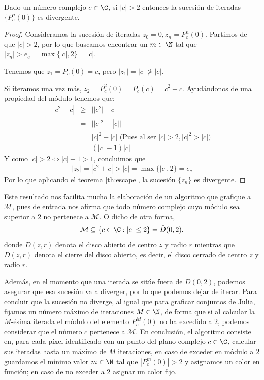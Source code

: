 \begin{proposicion}
  \label{prop:mandelbrot-escape}
  Dado un número complejo $c\in\C$, si $|c|>2$ entonces la sucesión de iteradas $\{P_c^n(0)\}$ es divergente.
\end{proposicion}
\begin{proof}
  Consideramos la sucesión de iteradas $z_0 = 0, z_n=P_c^n(0)$. Partimos de que $|c|>2$, por lo que buscamos encontrar un $m\in\N$ tal que $|z_n|>e_c=\max\{|c|,2\}=|c|$.
  
  Tenemos que $z_1=P_c(0)=c$, pero $|z_1|=|c|\not>|c|$.
  
  Si iteramos una vez más, $z_2=P_c^2(0)=P_c(c)=c^2+c$. Ayudándonos de una propiedad del módulo tenemos que:
  \begin{eqnarray*}
    |c^2+c| & \geq & ||c^2|-|c|| \\
            & = & ||c|^2 -|c|| \\
            & = & |c|^2-|c| \text{ (Pues al ser } |c|>2, |c|^2>|c|) \\
            & = & (|c|-1)|c| 
  \end{eqnarray*}
  Y como $|c|>2\Leftrightarrow |c|-1>1$, concluimos que
  $$
  |z_2|=|c^2+c| > |c| = \max\{|c|,2\} = e_c
  $$
  Por lo que aplicando el teorema \ref{th:escape}, la sucesión $\{z_n\}$ es divergente.
\end{proof}

Este resultado nos facilita mucho la elaboración de un algoritmo que grafique a $\mathcal{M}$, pues de entrada nos afirma que todo número complejo cuyo módulo sea superior a $2$ no pertenece a $\mathcal M$. O dicho de otra forma, 
$$
\mathcal{M}\subseteq \{c\in\C: |c|\leq 2\} = \bar D(0,2),
$$
donde $D(z,r)$ denota el disco abierto de centro $z$ y radio $r$ mientras que $\bar D(z,r)$ denota el cierre del disco abierto, es decir, el disco cerrado de centro $z$ y radio $r$.

Además, en el momento que una iterada se sitúe fuera de $\bar D(0,2)$, podemos asegurar que esa sucesión va a diverger, por lo que podemos dejar de iterar. Para concluir que la sucesión no diverge, al igual que para graficar conjuntos de Julia, fijamos un número máximo de iteraciones $M\in\N$, de forma que si al calcular la $M$-ésima iterada el módulo del elemento $P_c^{M}(0)$ no ha excedido a $2$, podemos considerar que el número $c$ pertenece a $\mathcal{M}$. En conclusión, el algoritmo consiste en, para cada píxel identificado con un punto del plano complejo $c\in\C$, calcular sus iteradas hasta un máximo de $M$ iteraciones, en caso de exceder en módulo a $2$ guardamos el mínimo valor $m\in\N$ tal que $|P_c^m(0)|>2$ y asignamos un color en función; en caso de no exceder a $2$ asignar un color fijo.

